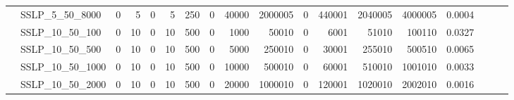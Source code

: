 \begin{landscape}
\begin{longtable}[c]{llrrrrrrrrrrrrrlll}
		& SSLP\_5\_50\_8000            & 0                           & 5                          & 0                          & 5                           & 250                        & 0                          & 40000                      & 2000005                   & 0                         & 440001                     & 2040005                    & 4000005                        & 0.0004                        &                          &                          &                          \\
		& SSLP\_10\_50\_100            & 0                           & 10                         & 0                          & 10                          & 500                        & 0                          & 1000                       & 50010                     & 0                         & 6001                       & 51010                      & 100110                         & 0.0327                        &                          &                          &                          \\
		& SSLP\_10\_50\_500            & 0                           & 10                         & 0                          & 10                          & 500                        & 0                          & 5000                       & 250010                    & 0                         & 30001                      & 255010                     & 500510                         & 0.0065                        &                          &                          &                          \\
		& SSLP\_10\_50\_1000           & 0                           & 10                         & 0                          & 10                          & 500                        & 0                          & 10000                      & 500010                    & 0                         & 60001                      & 510010                     & 1001010                        & 0.0033                        &                          &                          &                          \\
		& SSLP\_10\_50\_2000           & 0                           & 10                         & 0                          & 10                          & 500                        & 0                          & 20000                      & 1000010                   & 0                         & 120001                     & 1020010                    & 2002010                        & 0.0016                        &                          &                          &                          \\

\end{longtable}
\end{landscape}
